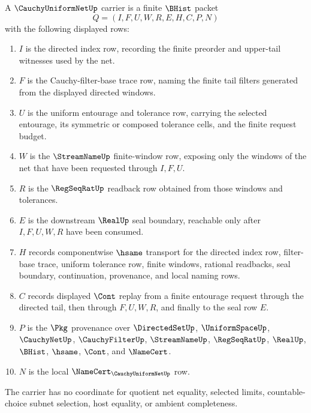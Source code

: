 \begin{definition}
\label{def:cauchy-uniform-net-carrier}
A $\CauchyUniformNetUp$ carrier is a finite $\BHist$ packet
$$
Q=(I,F,U,W,R,E,H,C,P,N)
$$
with the following displayed rows:
\begin{enumerate}
\item $I$ is the directed index row, recording the finite preorder and upper-tail witnesses used by the net.
\item $F$ is the Cauchy-filter-base trace row, naming the finite tail filters generated from the displayed directed windows.
\item $U$ is the uniform entourage and tolerance row, carrying the selected entourage, its symmetric or composed tolerance cells, and the finite request budget.
\item $W$ is the $\StreamNameUp$ finite-window row, exposing only the windows of the net that have been requested through $I,F,U$.
\item $R$ is the $\RegSeqRatUp$ readback row obtained from those windows and tolerances.
\item $E$ is the downstream $\RealUp$ seal boundary, reachable only after $I,F,U,W,R$ have been consumed.
\item $H$ records componentwise $\hsame$ transport for the directed index row, filter-base trace, uniform tolerance row, finite windows, rational readbacks, seal boundary, continuation, provenance, and local naming rows.
\item $C$ records displayed $\Cont$ replay from a finite entourage request through the directed tail, then through $F,U,W,R$, and finally to the seal row $E$.
\item $P$ is the $\Pkg$ provenance over $\DirectedSetUp$, $\UniformSpaceUp$, $\CauchyNetUp$, $\CauchyFilterUp$, $\StreamNameUp$, $\RegSeqRatUp$, $\RealUp$, $\BHist$, $\hsame$, $\Cont$, and $\NameCert$.
\item $N$ is the local $\NameCert_{\CauchyUniformNetUp}$ row.
\end{enumerate}
The carrier has no coordinate for quotient net equality, selected limits, countable-choice subnet selection, host equality, or ambient completeness.
\end{definition}

